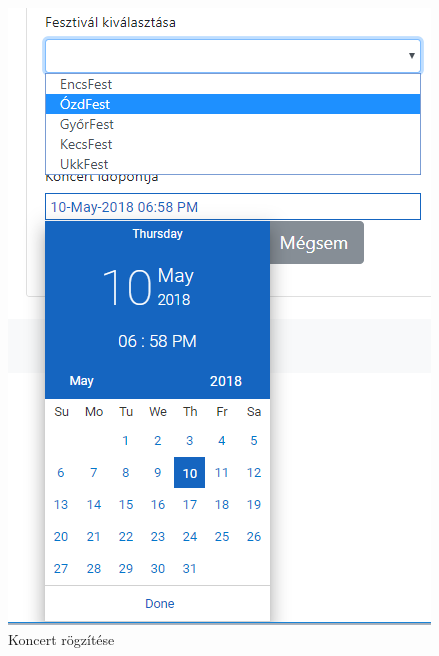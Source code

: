 \begin{figure}
\centering
\includegraphics[scale=0.64]{kepek/concertUpOpen.png}
\caption{Koncert rögzítése}
\label{fig:concertOpen}
\end{figure}